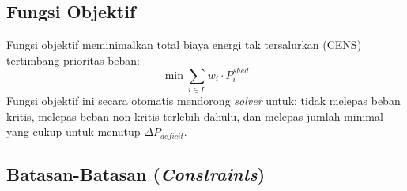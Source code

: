 \subsection{Fungsi Objektif}
\label{subsec:Fungsi_Objektif}

Fungsi objektif meminimalkan total biaya energi tak tersalurkan (CENS) tertimbang prioritas beban:
\begin{equation}
    \min \sum_{i\in L} w_{i} \cdot P_{i}^{shed}
\end{equation}
Fungsi objektif ini secara otomatis mendorong \textit{solver} untuk: tidak melepas beban kritis, melepas beban non-kritis terlebih dahulu, dan melepas jumlah minimal yang cukup untuk menutup $\Delta P_{deficit}$.

\subsection{Batasan-Batasan (\textit{Constraints})}
\label{subsec:Batasan_Batasan}

